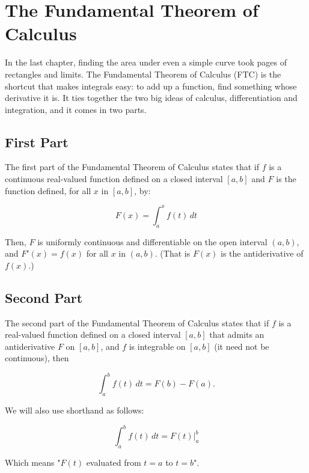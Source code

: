 \chapter{The Fundamental Theorem of Calculus}

In the last chapter, finding the area under even a simple curve took
pages of rectangles and limits. The Fundamental Theorem of Calculus (FTC)
is the shortcut that makes integrals easy: to add up a function, find
something whose derivative it is. It ties together the two big ideas of
calculus, differentiation and integration, and it comes in two parts.
\section{First Part}
The first part of the Fundamental Theorem of Calculus states that if
$f$ is a continuous real-valued function defined on a closed interval
$[a, b]$ and $F$ is the function defined, for all $x$ in $[a, b]$, by:

\begin{equation}
F(x) = \int_a^x f(t) \, dt
\end{equation}

Then, $F$ is uniformly continuous and differentiable on the open
interval $(a, b)$, and $F'(x) = f(x)$ for all $x$ in $(a, b)$.
(That is $F(x)$ is the antiderivative of $f(x)$.)

\section{Second Part}
The second part of the Fundamental Theorem of Calculus states that if
$f$ is a real-valued function defined on a closed interval $[a, b]$
that admits an antiderivative $F$ on $[a, b]$, and $f$ is integrable
on $[a, b]$ (it need not be continuous), then

\begin{equation}
\int_a^b f(t) \, dt = F(b) - F(a).
\end{equation}

We will also use shorthand as follows:

\begin{equation}
\int_a^b f(t)\,dt = F(t)|_a^b
\end{equation}

Which means "$F(t)$ evaluated from $t=a$ to $t=b$". 


